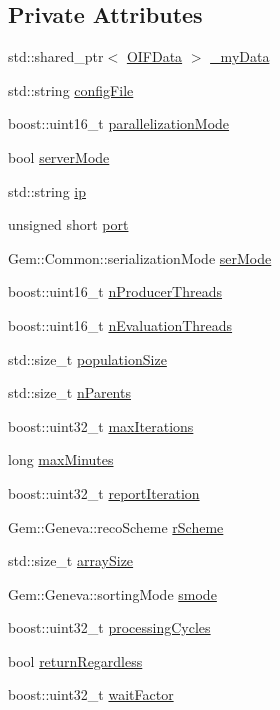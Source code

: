 \subsection*{Private Attributes}
\begin{DoxyCompactItemize}
\item 
std::shared\_\-ptr$<$ \hyperlink{classOIFData}{OIFData} $>$ \hyperlink{classOIFGeneva_a6f384385ad5eebc149aa9cc84665c271}{\_\-myData}
\item 
std::string \hyperlink{classOIFGeneva_abf5610433384454ae4884b2f17f01f01}{configFile}
\item 
boost::uint16\_\-t \hyperlink{classOIFGeneva_ae51bcfad038f5365a2ff5c4d0691e05b}{parallelizationMode}
\item 
bool \hyperlink{classOIFGeneva_a12fed8d5df83853111e8e9bba2b00b5e}{serverMode}
\item 
std::string \hyperlink{classOIFGeneva_a24b10918d314755d3c566ea8c17b2bc1}{ip}
\item 
unsigned short \hyperlink{classOIFGeneva_a49edc5e8fefa9137eab821b81f8015b1}{port}
\item 
Gem::Common::serializationMode \hyperlink{classOIFGeneva_aaad7df3d69cbe6399123820e7fef2a3c}{serMode}
\item 
boost::uint16\_\-t \hyperlink{classOIFGeneva_a4b3bfbf12d2911a081fc7c5feb9c4ae7}{nProducerThreads}
\item 
boost::uint16\_\-t \hyperlink{classOIFGeneva_a9afb57f9439eddc693b06456c7f1a4a6}{nEvaluationThreads}
\item 
std::size\_\-t \hyperlink{classOIFGeneva_a9797a7ec73f3bf9b192799813f601600}{populationSize}
\item 
std::size\_\-t \hyperlink{classOIFGeneva_a01cfc180dd253ea8767446e4116f8bb2}{nParents}
\item 
boost::uint32\_\-t \hyperlink{classOIFGeneva_ae2a0cd2de953edc56ffa0dbb743fc9af}{maxIterations}
\item 
long \hyperlink{classOIFGeneva_a48b49d12e4ecd4a0e19b31692224f2a7}{maxMinutes}
\item 
boost::uint32\_\-t \hyperlink{classOIFGeneva_a4419a9af665e5589174b4442fb3e44b9}{reportIteration}
\item 
Gem::Geneva::recoScheme \hyperlink{classOIFGeneva_a84d9c1da4a30943abe44cbc58162755f}{rScheme}
\item 
std::size\_\-t \hyperlink{classOIFGeneva_ae17ccd19943bfe1ced5f7b0373c36ee9}{arraySize}
\item 
Gem::Geneva::sortingMode \hyperlink{classOIFGeneva_a74949f91a856d291c760b6668ace8275}{smode}
\item 
boost::uint32\_\-t \hyperlink{classOIFGeneva_a1e194ecfec04056b27e32205839a3f60}{processingCycles}
\item 
bool \hyperlink{classOIFGeneva_a812f07c15fdfda372b6fb82ad9d3795a}{returnRegardless}
\item 
boost::uint32\_\-t \hyperlink{classOIFGeneva_ad40b4a27317aacf88a920b07c23010ab}{waitFactor}
\end{DoxyCompactItemize}


